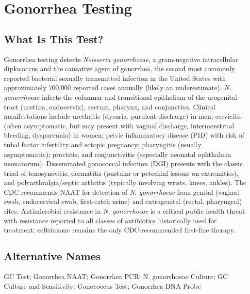 \chapter{Gonorrhea Testing}

\section*{What Is This Test?}
Gonorrhea testing detects \textit{Neisseria gonorrhoeae}, a gram-negative intracellular diplococcus and the causative agent of gonorrhea, the second most commonly reported bacterial sexually transmitted infection in the United States with approximately 700,000 reported cases annually (likely an underestimate). \textit{N. gonorrhoeae} infects the columnar and transitional epithelium of the urogenital tract (urethra, endocervix), rectum, pharynx, and conjunctiva. Clinical manifestations include urethritis (dysuria, purulent discharge) in men; cervicitis (often asymptomatic, but may present with vaginal discharge, intermenstrual bleeding, dyspareunia) in women; pelvic inflammatory disease (PID) with risk of tubal factor infertility and ectopic pregnancy; pharyngitis (usually asymptomatic); proctitis; and conjunctivitis (especially neonatal ophthalmia neonatorum). Disseminated gonococcal infection (DGI) presents with the classic triad of tenosynovitis, dermatitis (pustular or petechial lesions on extremities), and polyarthralgia/septic arthritis (typically involving wrists, knees, ankles). The CDC recommends NAAT for detection of \textit{N. gonorrhoeae} from genital (vaginal swab, endocervical swab, first-catch urine) and extragenital (rectal, pharyngeal) sites. Antimicrobial resistance in \textit{N. gonorrhoeae} is a critical public health threat with resistance reported to all classes of antibiotics historically used for treatment; ceftriaxone remains the only CDC-recommended first-line therapy.

\section*{Alternative Names}
GC Test; Gonorrhea NAAT; Gonorrhea PCR; N. gonorrhoeae Culture; GC Culture and Sensitivity; Gonococcus Test; Gonorrhea DNA Probe


